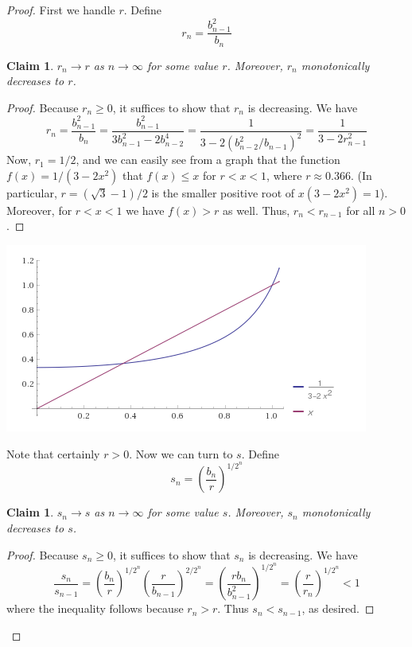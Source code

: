 \documentclass[12pt]{article}
\newtheorem{claim}[definition]{Claim}
\begin{document}
\begin{proof}
First we handle $r$. Define
\[ r_n = \frac{b_{n-1}^2}{b_n} \]

\begin{claim}
  $r_n \to r$ as $n\to \infty$ for some value $r$.
  Moreover, $r_n$ monotonically decreases to $r$.
\end{claim}
\begin{proof}
  Because $r_n \ge 0$, it suffices to show that $r_n$ is decreasing.
  We have
  \[ r_n = \frac{b_{n-1}^2}{b_n}
  = \frac{b_{n-1}^2}{3b_{n-1}^2 - 2b_{n-2}^4}
  = \frac{1}{3 - 2(b_{n-2}^2/b_{n-1})^2}
  = \frac{1}{ 3 - 2r_{n-1}^2} \]
  Now, $r_1 = 1/2$, and we can easily see from a graph that the function
  $f(x) = 1/(3-2x^2)$ that $f(x) \le x$ for $r < x < 1$, where
  $r \approx 0.366$. (In particular, $r = (\sqrt 3 - 1)/2$ is the smaller
  positive root of $x(3-2x^2)=1$).
  Moreover, for $r < x < 1$ we have $f(x) > r$ as well.
  Thus, $r_n < r_{n-1}$ for all $n > 0$.

\end{proof}

\includegraphics{RatioConvergencePlot}

Note that certainly $r > 0$.
Now we can turn to $s$. Define
\[ s_n = \left(\frac{b_n}{r}\right)^{1/2^n} \]

\begin{claim}
  $s_n \to s$ as $n\to \infty$ for some value $s$.
  Moreover, $s_n$ monotonically decreases to $s$.
\end{claim}
\begin{proof}
  Because $s_n \ge 0$, it suffices to show that
  $s_n$ is decreasing.
  We have
  \[ \frac{s_{n}}{s_{n-1}}
    = \left(\frac{b_n}{r}\right)^{1/2^n} \left(\frac{r}{b_{n-1}}\right)^{2/2^n}
    = \left(\frac{rb_n}{b_{n-1}^2}\right)^{1/2^n}
    = \left(\frac{r}{r_n}\right)^{1/2^n} < 1
  \]
  where the inequality follows because $r_n > r$.
  Thus $s_n < s_{n-1}$, as desired.
\end{proof}


\end{proof}
\end{document}
